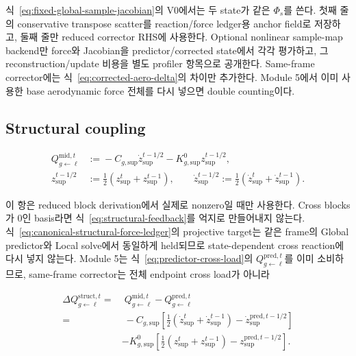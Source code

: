 \documentclass[11pt,a4paper]{article}
\begin{document}
식~\eqref{eq:fixed-global-sample-jacobian}의 V0에서는 두 state가 같은 \(\Phi_s\)를 쓴다.
첫째 줄의 conservative transpose scatter를 reaction/force ledger용 anchor field로 저장하고,
둘째 줄만 reduced corrector RHS에 사용한다.
Optional nonlinear sample-map backend만 force와 Jacobian을 predictor/corrected state에서 각각 평가하고,
그 reconstruction/update 비용을 별도 profiler 항목으로 공개한다.
Same-frame corrector에는 식~\eqref{eq:corrected-aero-delta}의 차이만 추가한다.
Module 5에서 이미 사용한 base aerodynamic force 전체를 다시 넣으면 double counting이다.

\subsection*{Structural coupling}

\begin{equation}
\begin{aligned}
  Q_{g\leftarrow\ell}^{\mathrm{mid},t}
  &:={}
  -C_{g,\mathrm{sup}}\dot z_{\mathrm{sup}}^{t-1/2}
  -K_{g,\mathrm{sup}}^{0}z_{\mathrm{sup}}^{t-1/2},\\
  z_{\mathrm{sup}}^{t-1/2}
  &:={}
  \frac12(z_{\mathrm{sup}}^t+z_{\mathrm{sup}}^{t-1}),
  \qquad
  \dot z_{\mathrm{sup}}^{t-1/2}
  :=\frac12(\dot z_{\mathrm{sup}}^t+\dot z_{\mathrm{sup}}^{t-1}).
\end{aligned}
  \label{eq:structural-feedback}
\end{equation}

이 항은 reduced block derivation에서 실제로 nonzero일 때만 사용한다.
Cross blocks가 0인 basis라면 식~\eqref{eq:structural-feedback}를 억지로 만들어내지 않는다.
식~\eqref{eq:canonical-structural-force-ledger}의 projective target는 같은 frame의
Global predictor와 Local solve에서 동일하게 held되므로 state-dependent cross reaction에 다시 넣지 않는다.
Module 5는 식~\eqref{eq:predictor-cross-load}의
\(Q_{g\leftarrow\ell}^{\mathrm{pred},t}\)를 이미 소비하므로,
same-frame corrector는 전체 endpoint cross load가 아니라

\begin{equation}
\begin{aligned}
  \Delta Q_{g\leftarrow\ell}^{\mathrm{struct},t}
  =&\;
  Q_{g\leftarrow\ell}^{\mathrm{mid},t}
  -Q_{g\leftarrow\ell}^{\mathrm{pred},t}\\
  =&\;
  -C_{g,\mathrm{sup}}
  \left[
    \frac12(\dot z_{\mathrm{sup}}^t+\dot z_{\mathrm{sup}}^{t-1})
    -\dot z_{\mathrm{sup}}^{\mathrm{pred},t-1/2}
  \right]\\
  &-K_{g,\mathrm{sup}}^{0}
  \left[
    \frac12(z_{\mathrm{sup}}^t+z_{\mathrm{sup}}^{t-1})
    -z_{\mathrm{sup}}^{\mathrm{pred},t-1/2}
  \right].
\end{aligned}
\end{equation}
\end{document}
